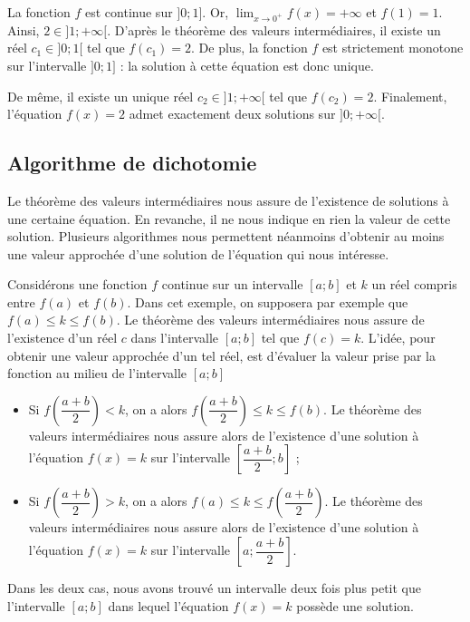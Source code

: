 \documentclass[11pt,fleqn, openany]{book} %
\begin{document}
\begin{example}
 La fonction $f$ est continue sur $]0;1]$. Or, $\displaystyle\lim_{x\to 0^+}f(x)=+\infty$ et $f(1)=1$. Ainsi, $2 \in ]1 ; +\infty[$. D'après le théorème des valeurs intermédiaires, il existe un réel $c_1\in ]0;1[$ tel que $f(c_1)=2$. De plus, la fonction $f$ est strictement monotone sur l'intervalle $]0;1]$ : la solution à cette équation est donc unique.
 
 De même, il existe un unique réel $c_2\in]1;+\infty[$ tel que $f(c_2)=2$. Finalement, l'équation $f(x)=2$ admet exactement deux solutions sur $]0;+\infty[$.
   


 \end{example}

\newpage

\subsection{Algorithme de dichotomie}

Le théorème des valeurs intermédiaires nous assure de l'existence de solutions à une certaine équation. En revanche, il ne nous indique en rien la valeur de cette solution. Plusieurs algorithmes nous permettent néanmoins d'obtenir au moins une valeur approchée d'une solution de l'équation qui nous intéresse.

Considérons une fonction $f$ continue sur un intervalle $[a;b]$ et $k$ un réel compris entre $f(a)$ et $f(b)$. Dans cet exemple, on supposera par exemple que $f(a) \leqslant k \leqslant f(b)$. Le théorème des valeurs intermédiaires nous assure de l'existence d'un réel $c$ dans l'intervalle $[a;b]$ tel que $f(c)=k$. L'idée, pour obtenir une valeur approchée d'un tel réel, est d'évaluer la valeur prise par la fonction au milieu de l'intervalle $[a;b]$
\begin{itemize}
\item Si $f\left(\dfrac{a+b}{2}\right) < k$, on a alors $f\left(\dfrac{a+b}{2}\right) \leqslant k \leqslant f(b)$. Le théorème des valeurs intermédiaires nous assure alors de l'existence d'une solution à l'équation $f(x)=k$ sur l'intervalle $\left[\dfrac{a+b}{2};b\right]$ ;
\item Si $f\left(\dfrac{a+b}{2}\right) > k$, on a alors $f(a) \leqslant k \leqslant f\left(\dfrac{a+b}{2}\right)$. Le théorème des valeurs intermédiaires nous assure alors de l'existence d'une solution à l'équation $f(x)=k$ sur l'intervalle $\left[a;\dfrac{a+b}{2}\right]$.
\end{itemize}
Dans les deux cas, nous avons trouvé un intervalle deux fois plus petit que l'intervalle $[a;b]$ dans lequel l'équation $f(x)=k$ possède une solution. 
\end{document}
